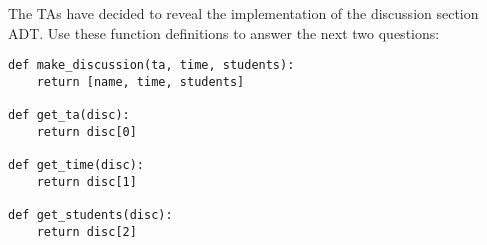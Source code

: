 The TAs have decided to reveal the implementation of the discussion section
ADT. Use these function definitions to answer the next two questions:

\begin{lstlisting}
def make_discussion(ta, time, students):
    return [name, time, students]

def get_ta(disc):
    return disc[0]

def get_time(disc):
    return disc[1]

def get_students(disc):
    return disc[2]
\end{lstlisting}
